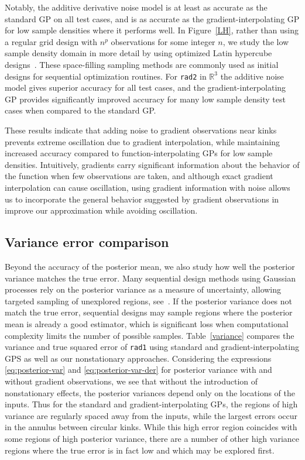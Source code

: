 \documentclass{article}
\newcommand{\R}{\mathbb{R}}
\numberwithin{equation}{section}
\begin{document}
Notably, the additive derivative noise model is at least as accurate as the standard GP on all test cases, and is as accurate as the gradient-interpolating GP for low sample densities where it performs well. In Figure~\ref{LH}, rather than using a regular grid design with $n^p$ observations for some integer $n$, we study the low sample density domain in more detail by using optimized Latin hypercube designs~\cite{bates2004formulation}. These space-filling sampling methods are commonly used as initial designs for sequential optimization routines. For \texttt{rad2} in $\R^3$ the additive noise model gives superior accuracy for all test cases, and the gradient-interpolating GP provides significantly improved accuracy for many low sample density test cases when compared to the standard GP.

These results indicate that adding noise to gradient observations near kinks prevents extreme oscillation due to gradient interpolation, while maintaining increased accuracy compared to function-interpolating GPs for low sample densities. Intuitively, gradients carry significant information about the behavior of the function when few observations are taken, and although exact gradient interpolation can cause oscillation, using gradient information with noise allows us to incorporate the general behavior suggested by gradient observations in improve our approximation while avoiding oscillation.

\subsection{Variance error comparison}
Beyond the accuracy of the posterior mean, we also study how well the posterior variance matches the true error. Many sequential design methods using Gaussian processes rely on the posterior variance as a measure of uncertainty, allowing targeted sampling of unexplored regions, see~\cite{jones1998efficient, ranjan2008sequential}. If the posterior variance does not match the true error, sequential designs may sample regions where the posterior mean is already a good estimator, which is significant loss when computational complexity limits the number of possible samples. Table~\ref{variance} compares the variance and true squared error of \texttt{rad1} using standard and gradient-interpolating GPS as well as our nonstationary approaches. Considering the expressions \eqref{eq:posterior-var} and \eqref{eq:posterior-var-der} for posterior variance with and without gradient observations, we see that without the introduction of nonstationary effects, the posterior variances depend only on the locations of the inputs. Thus for the standard and gradient-interpolating GPs, the regions of high variance are regularly spaced away from the inputs, while the largest errors occur in the annulus between circular kinks. While this high error region coincides with some regions of high posterior variance, there are a number of other high variance regions where the true error is in fact low and which may be explored first.
\end{document}
